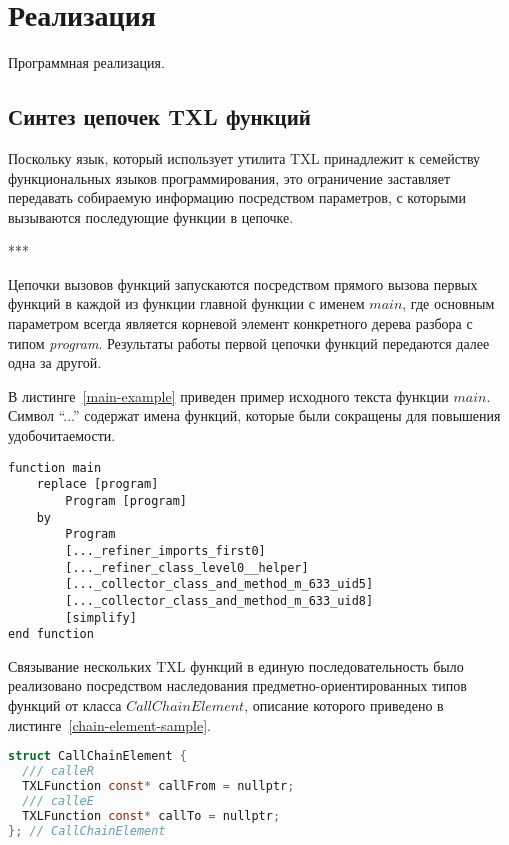 \chapter{Реализация}

Программная реализация.

\section{Синтез цепочек TXL функций}

Поскольку язык, который использует утилита TXL принадлежит к семейству функциональных языков программирования, это ограничение заставляет передавать собираемую информацию посредством параметров, с которыми вызываются последующие функции в цепочке.

***

Цепочки вызовов функций запускаются посредством прямого вызова первых функций в каждой из функции главной функции с именем $main$, где  основным параметром всегда является корневой элемент конкретного дерева разбора с типом \textit{program}.
Результаты работы первой цепочки функций передаются далее одна за другой.

В листинге~\ref{main-example} приведен пример исходного текста функции $main$.
Символ ``...'' содержат имена функций, которые были сокращены для повышения удобочитаемости.

\begin{lstlisting}[frame=single, language=TXL, label={main-example}, caption={Пример исходного текста главной функции}]
function main
	replace [program]
		Program [program]
	by
		Program
		[..._refiner_imports_first0]
		[..._refiner_class_level0__helper]
		[..._collector_class_and_method_m_633_uid5]
		[..._collector_class_and_method_m_633_uid8]
		[simplify]
end function
\end{lstlisting}

Связывание нескольких TXL функций в единую последовательность было реализовано посредством наследования предметно-ориентированных типов функций от класса $CallChainElement$, описание которого приведено в листинге~\ref{chain-element-sample}.

\begin{lstlisting}[frame=single, language=C, label={chain-element-sample}, caption={Исходный код определения элемента цепочки вызовов}]
struct CallChainElement {
  /// calleR
  TXLFunction const* callFrom = nullptr;
  /// calleE
  TXLFunction const* callTo = nullptr;
}; // CallChainElement
\end{lstlisting}

